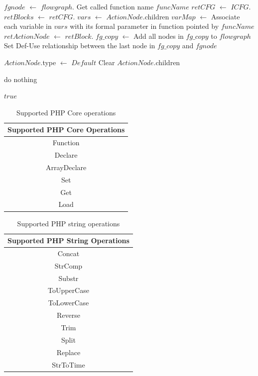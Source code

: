 \begin{algorithm}
\begin{algorithmic}[1]

      \State $fgnode$ $\gets$ $flowgraph$.
      \State Get called function name $funcName$
      \State $retCFG$ $\gets$ $ICFG$.
      \State $retBlocks$ $\gets$ $retCFG$.
      \State $vars$ $\gets$ $ActionNode$.children
      \State $varMap$ $\gets$ Associate each variable in $vars$ with its formal parameter in function pointed by $funcName$
        \State $retActionNode$ $\gets$ $retBlock$.
        \State $fg\_copy$ $\gets$ 
        \State Add all nodes in $fg\_copy$ to $flowgraph$
        \State Set Def-Use relationship between the last node in $fg\_copy$ and $fgnode$
      \EndFor

      \State $ActionNode$.type $\gets$ $Default$
      \State Clear $ActionNode$.children
    \EndCase

      \State do nothing
    \EndCase


  \EndSwitch

  \Return $true$
\EndFunction
\end{algorithmic}
\end{algorithm}


\begin{table}
\centering
\begin{tabular}{c}
Supported PHP Core Operations \\
\hline
Function \\
Declare \\
ArrayDeclare \\
Set \\
Get \\
Load \\
\end{tabular}
\caption{Supported PHP Core operations}
\label{tab:b}
\end{table}


\begin{table}
\centering
\begin{tabular}{c}
Supported PHP String Operations \\
\hline
Concat \\
StrComp \\
Substr \\
ToUpperCase \\
ToLowerCase \\
Reverse \\
Trim \\
Split \\
Replace \\
StrToTime \\
\end{tabular}
\caption{Supported PHP string operations}
\label{tab:a}
\end{table}

